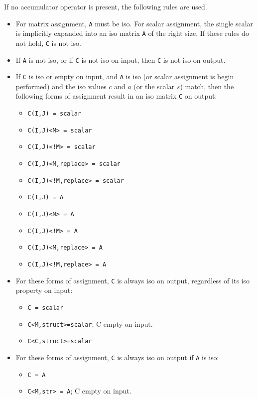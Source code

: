 \documentclass[12pt]{article}
\begin{document}
If no accumulator operator is present, the following rules are used.

\begin{itemize}
\item 
For matrix assignment, \verb'A' must be iso.  For scalar assignment, the single
scalar is implicitly expanded into an iso matrix \verb'A' of the right size.
If these rules do not hold, \verb'C' is not iso.

\item
If \verb'A' is not iso, or if \verb'C' is not iso on input, then \verb'C' is
not iso on output.

\item
If \verb'C' is iso or empty on input, and \verb'A' is iso (or scalar assignment
is begin performed) and the iso values $c$ and $a$ (or the scalar $s$) match,
then the following forms of assignment result in an iso matrix \verb'C'  on
output:

                \begin{itemize}
                \item \verb'C(I,J) = scalar'
                \item \verb'C(I,J)<M> = scalar'
                \item \verb'C(I,J)<!M> = scalar'
                \item \verb'C(I,J)<M,replace> = scalar'
                \item \verb'C(I,J)<!M,replace> = scalar'
                \item \verb'C(I,J) = A'
                \item \verb'C(I,J)<M> = A'
                \item \verb'C(I,J)<!M> = A'
                \item \verb'C(I,J)<M,replace> = A'
                \item \verb'C(I,J)<!M,replace> = A'
                \end{itemize}

\item
For these forms of assignment, \verb'C' is always iso on output, regardless
of its iso property on input:

                \begin{itemize}
                \item \verb'C = scalar'
                \item \verb'C<M,struct>=scalar'; C empty on input.
                \item \verb'C<C,struct>=scalar'
                \end{itemize}

\item
For these forms of assignment, \verb'C' is always iso on output if \verb'A'
is iso:

                \begin{itemize}
                \item \verb'C = A'
                \item \verb'C<M,str> = A'; C empty on input.
                \end{itemize}
\end{itemize}
\end{document}
